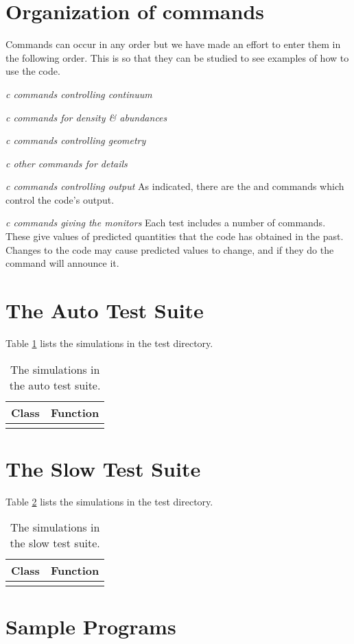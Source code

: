 \section{Organization of commands}

Commands can occur in any order but we have made an effort to
enter them in the following order.
This is so that they can be studied to see examples of how to
use the code.

\emph{c commands controlling continuum}

\emph{c commands for density \& abundances}

\emph{c commands controlling geometry}

\emph{c other commands for details}

\emph{c commands controlling output}
As indicated, there are the  and  commands
which control the code's output.

\emph{c commands giving the monitors}
Each test includes a number of  commands.
These give values of predicted quantities that the code has
obtained in the past.
Changes to the code may cause predicted values to change,
and if they do the  command will
announce it.

\section{The Auto Test Suite}

Table \ref{tab:AutoSimulationList} lists the simulations in the 
 test directory.

\begin{table}
\centering
\caption{
The simulations in the auto test suite.}
\begin{tabular}{ c c  }
\hline
Class & Function \\
\hline

\hline
\label{tab:AutoSimulationList}
\end{tabular}
\end{table}



\section{The Slow Test Suite}

Table \ref{tab:SlowSimulationList} lists the simulations in the
 test directory.

\begin{table}
\centering
\caption{
The simulations in the slow test suite.}
\begin{tabular}{ c c  }
\hline
Class & Function \\
\hline

\hline
\label{tab:SlowSimulationList}
\end{tabular}
\end{table}




\section{Sample Programs} 
